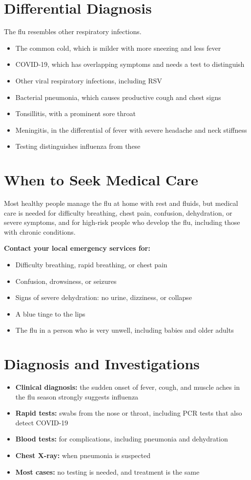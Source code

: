 \section*{Differential Diagnosis}
The flu resembles other respiratory infections.
\begin{itemize}
    \item The common cold, which is milder with more sneezing and less fever
    \item COVID-19, which has overlapping symptoms and needs a test to distinguish
    \item Other viral respiratory infections, including RSV
    \item Bacterial pneumonia, which causes productive cough and chest signs
    \item Tonsillitis, with a prominent sore throat
    \item Meningitis, in the differential of fever with severe headache and neck stiffness
    \item Testing distinguishes influenza from these
\end{itemize}

\section*{When to Seek Medical Care}
Most healthy people manage the flu at home with rest and fluids, but medical care is needed for difficulty breathing, chest pain, confusion, dehydration, or severe symptoms, and for high-risk people who develop the flu, including those with chronic conditions.

\textbf{Contact your local emergency services for:}
\begin{itemize}
    \item Difficulty breathing, rapid breathing, or chest pain
    \item Confusion, drowsiness, or seizures
    \item Signs of severe dehydration: no urine, dizziness, or collapse
    \item A blue tinge to the lips
    \item The flu in a person who is very unwell, including babies and older adults
\end{itemize}

\section*{Diagnosis and Investigations}
\begin{itemize}
    \item \textbf{Clinical diagnosis:} the sudden onset of fever, cough, and muscle aches in the flu season strongly suggests influenza
    \item \textbf{Rapid tests:} swabs from the nose or throat, including PCR tests that also detect COVID-19
    \item \textbf{Blood tests:} for complications, including pneumonia and dehydration
    \item \textbf{Chest X-ray:} when pneumonia is suspected
    \item \textbf{Most cases:} no testing is needed, and treatment is the same
\end{itemize}

